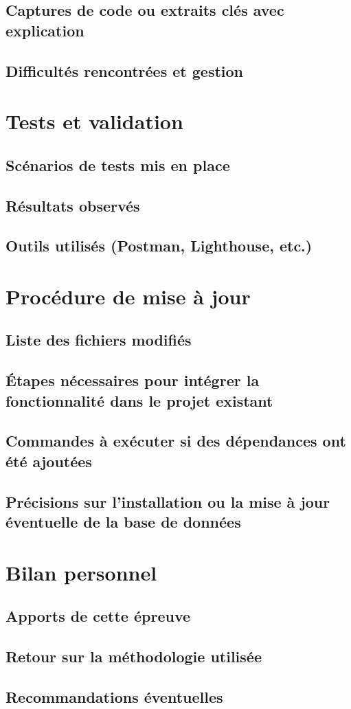 \documentclass[a4paper,12pt]{report}
\begin{document}
  \subsection{Captures de code ou extraits clés avec explication}
  \subsection{Difficultés rencontrées et gestion}

\section{Tests et validation}
  \subsection{Scénarios de tests mis en place}
  \subsection{Résultats observés}
  \subsection{Outils utilisés (Postman, Lighthouse, etc.)}

\section{Procédure de mise à jour}
  \subsection{Liste des fichiers modifiés}
  \subsection{Étapes nécessaires pour intégrer la fonctionnalité dans le projet existant}
  \subsection{Commandes à exécuter si des dépendances ont été ajoutées}
  \subsection{Précisions sur l’installation ou la mise à jour éventuelle de la base de données}

\section{Bilan personnel}
  \subsection{Apports de cette épreuve}
  \subsection{Retour sur la méthodologie utilisée}
  \subsection{Recommandations éventuelles}
\end{document}

